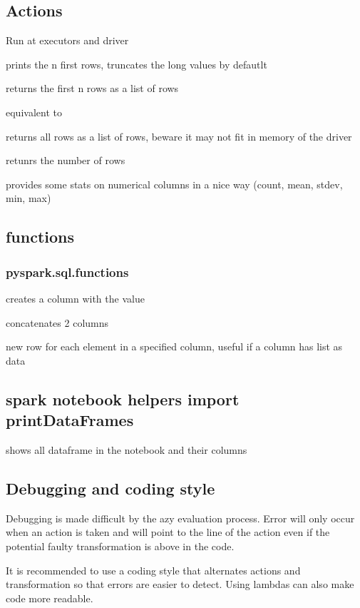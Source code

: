 			

	\subsection{Actions}

		Run at executors and driver

		 prints the n first rows, truncates the long values by defautlt

		 returns the first n rows as a list of rows

		 equivalent to 

		 returns all rows as a list of rows, beware it may not fit in memory of the driver

		 retunrs the number of rows

		 provides some stats on numerical columns in a nice way (count, mean, stdev, min, max)


	\subsection{functions}

		\subsubsection{pyspark.sql.functions}


			 creates a column with the value 

			 concatenates 2 columns

			  new row for each element in a specified column, useful if a column has list as data


		\subsection{spark notebook helpers import printDataFrames}


			 shows all dataframe in the notebook and their columns 


	\subsection{Debugging and coding style}

		Debugging is made difficult by the azy evaluation process. Error will only occur when an action is taken and will point to the line of the action even if the potential faulty transformation is above in the code.

		It is recommended to use a coding style that alternates actions and transformation so that errors are easier to detect. Using lambdas can also make code more readable.





